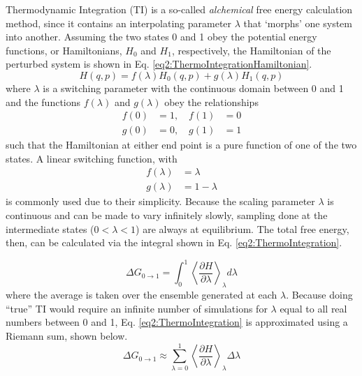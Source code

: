 Thermodynamic Integration (TI) is a so-called \emph{alchemical} free energy
calculation method, since it contains an interpolating parameter $\lambda$ that
`morphs' one system into another. \cite{Leach_Book_MolModel_2001,
Tuckerman_Book_StatMech_TheoryAndSim} Assuming the two states 0 and 1 obey the
potential energy functions, or Hamiltonians, $H_0$ and $H_1$, respectively, the
Hamiltonian of the perturbed system is shown in Eq.
\ref{eq2:ThermoIntegrationHamiltonian}.
\begin{equation}
   H(q,p) = f(\lambda) H_0(q,p) + g(\lambda) H_1(q,p)
   \label{eq2:ThermoIntegrationHamiltonian}
\end{equation}
where $\lambda$ is a switching parameter with the continuous domain between 0
and 1 and the functions $f(\lambda)$ and $g(\lambda)$ obey the relationships
\begin{eqnarray*}
   f(0) & = 1,\quad f(1) & = 0 \\
   g(0) & = 0,\quad g(1) & = 1
\end{eqnarray*}
such that the Hamiltonian at either end point is a pure function of one of the
two states. A linear switching function, with
\begin{eqnarray*}
   f(\lambda) & = \lambda \\
   g(\lambda) & = 1 - \lambda
\end{eqnarray*}
is commonly used due to their simplicity. Because the scaling parameter
$\lambda$ is continuous and can be made to vary infinitely slowly, sampling done
at the intermediate states (\ie $0 < \lambda < 1$) are always at equilibrium.
The total free energy, then, can be calculated via the integral shown in Eq.
\ref{eq2:ThermoIntegration}. \cite{Leach_Book_MolModel_2001}

\begin{equation}
   \Delta G_{0 \rightarrow 1} = \int _ 0 ^ 1 \left \langle \frac {\partial H}
         {\partial \lambda} \right \rangle _ {\lambda} d\lambda
   \label{eq2:ThermoIntegration}
\end{equation}
where the average is taken over the ensemble generated at each $\lambda$.
Because doing ``true'' TI would require an infinite number of simulations for
$\lambda$ equal to all real numbers between 0 and 1, Eq.
\ref{eq2:ThermoIntegration} is approximated using a Riemann sum, shown below.
\begin{equation*}
   \Delta G_{0 \rightarrow 1} \approx \sum _ {\lambda = 0} ^ 1 \left \langle
         \frac {\partial H} {\partial \lambda} \right \rangle _ {\lambda} \Delta
         \lambda
\end{equation*}

